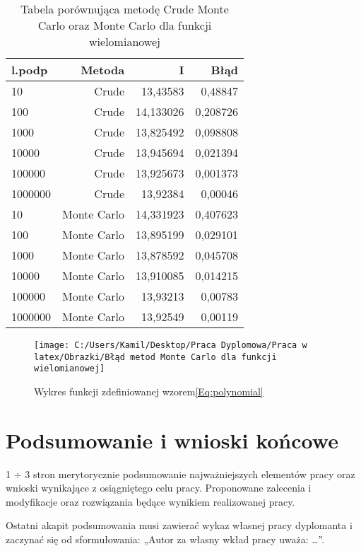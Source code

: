 \documentclass[12pt,twoside]{article}
\begin{document}
\begin{table}[h]
\centering 
\caption{Tabela porównująca metodę Crude Monte Carlo oraz Monte Carlo dla funkcji wielomianowej}
\label{tabela9.7}
\begin{tabular}{lrrr}
\toprule
{l.podp} & Metoda &  I &  Błąd \\
\midrule
10  &     Crude & 13,43583  &   0,48847 \\
100  &     Crude & 14,133026 &   0,208726 \\
1000  &    Crude & 13,825492  &   0,098808  \\
10000  &    Crude & 13,945694  &   0,021394  \\
100000  &    Crude & 13,925673 &    0,001373   \\
1000000  &    Crude & 13,92384 &    0,00046   \\
\midrule
10  &     Monte Carlo & 14,331923  &   0,407623 \\
100  &     Monte Carlo & 13,895199 &   0,029101\\
1000  &    Monte Carlo & 13,878592   &   0,045708  \\
10000  &    Monte Carlo & 13,910085  &   0,014215  \\
100000  &    Monte Carlo & 13,93213 &    0,00783   \\
1000000  &    Monte Carlo & 13,92549 &    0,00119   \\
\bottomrule
\end{tabular}
\end{table}

\begin{figure}
\texttt{[image: C:/Users/Kamil/Desktop/Praca Dyplomowa/Praca w latex/Obrazki/Błąd metod Monte Carlo dla funkcji wielomianowej]}
\caption{Wykres funkcji zdefiniowanej wzorem\eqref{Eq:polynomial}}
\end{figure}

\section{Podsumowanie i wnioski końcowe}

1 $\div$ 3 stron merytorycznie podsumowanie najważniejszych elementów pracy oraz wnioski wynikające z osiągniętego celu pracy. Proponowane zalecenia i modyfikacje oraz rozwiązania będące wynikiem realizowanej pracy.

Ostatni akapit podsumowania musi zawierać wykaz własnej pracy dyplomanta i zaczynać się od sformułowania: „Autor za własny wkład pracy uważa: \ldots”.
\end{document}
